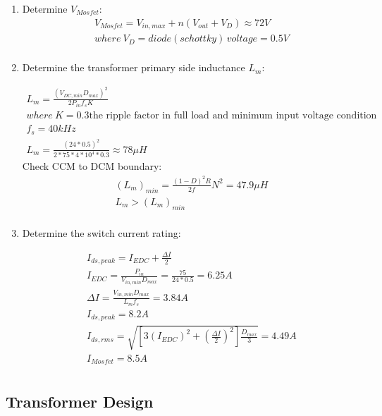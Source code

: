 \documentclass{article}
\begin{document}
\begin{enumerate}
  \item Determine $V_{Mosfet}$:
  \begin{gather*}
      V_{Mosfet}=V_{in, max}+n(V_{out}+V_D)\approx 72V\\
      where \: V_D=diode(schottky)\, voltage=0.5V\\
  \end{gather*}

  \item Determine the transformer primary side inductance $L_m$:
  
  \begin{gather*}
      L_m=\frac{(V_{DC, min}D_{max})^2}{2P_{in}f_sK} \\ 
      where \: K =0.3\text{the ripple factor in full load and minimum input voltage condition}\\
      f_s = 40kHz\\
      L_m=\frac{(24*0.5)^2}{2*75*4*10^4*0.3}\approx 78\mu H
  \end{gather*}
  Check CCM to DCM boundary: 
  \begin{gather*}
      (L_m)_{min}=\frac{(1-D)^2R}{2f}N^2=47.9\mu H\\
      L_m>(L_m)_{min}\\
  \end{gather*}
  
  \item  Determine the switch current rating:
  
  \begin{gather*}
      I_{ds, peak}= I_{EDC}+\frac{\Delta I}{2} \\
      I_{EDC}=\frac{P_{in}}{V_{in, min}D_{max}}=\frac{75}{24*0.5}=6.25A\\
      \Delta I=\frac{V_{in, min}D_{max}}{L_mf_s}=3.84A\\
      I_{ds, peak}= 8.2A\\
      I_{ds, rms}=\sqrt{[3(I_{EDC})^2+(\frac{\Delta I}{2})^2]\frac{D_{max}}{3}}=4.49A\\
      I_{Mosfet}=8.5A\\
  \end{gather*}
  
 
\end{enumerate}
    
\subsection{Transformer Design}
\end{document}
